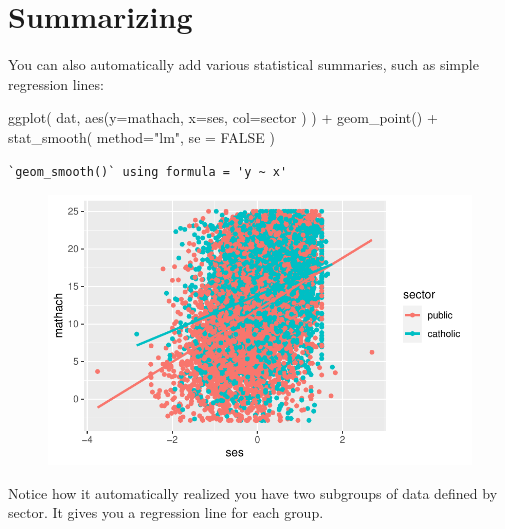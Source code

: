 \documentclass[
  letterpaper,
  DIV=11,
  numbers=noendperiod]{scrreprt}
\newenvironment{Shaded}{\begin{snugshade}}{\end{snugshade}}
\newcommand{\AttributeTok}[1]{\textcolor[rgb]{0.49,0.56,0.16}{#1}}
\newcommand{\ConstantTok}[1]{\textcolor[rgb]{0.53,0.00,0.00}{#1}}
\newcommand{\FunctionTok}[1]{\textcolor[rgb]{0.02,0.16,0.49}{#1}}
\newcommand{\NormalTok}[1]{\textcolor[rgb]{0.00,0.44,0.13}{#1}}
\newcommand{\SpecialCharTok}[1]{\textcolor[rgb]{0.25,0.44,0.63}{#1}}
\newcommand{\StringTok}[1]{\textcolor[rgb]{0.25,0.44,0.63}{#1}}
\begin{document}
\hypertarget{summarizing}{%
\section{Summarizing}\label{summarizing}}

You can also automatically add various statistical summaries, such as
simple regression lines:

\begin{Shaded}
\begin{Highlighting}[]
\FunctionTok{ggplot}\NormalTok{( dat, }\FunctionTok{aes}\NormalTok{(}\AttributeTok{y=}\NormalTok{mathach, }\AttributeTok{x=}\NormalTok{ses, }\AttributeTok{col=}\NormalTok{sector ) ) }\SpecialCharTok{+} 
    \FunctionTok{geom\_point}\NormalTok{() }\SpecialCharTok{+} 
    \FunctionTok{stat\_smooth}\NormalTok{( }\AttributeTok{method=}\StringTok{"lm"}\NormalTok{, }\AttributeTok{se =} \ConstantTok{FALSE}\NormalTok{ )}
\end{Highlighting}
\end{Shaded}

\begin{verbatim}
`geom_smooth()` using formula = 'y ~ x'
\end{verbatim}

\begin{figure}[H]

{\centering \includegraphics{intro_ggplot_files/figure-pdf/unnamed-chunk-4-1.pdf}

}

\end{figure}

Notice how it automatically realized you have two subgroups of data
defined by sector. It gives you a regression line for each group.
\end{document}
